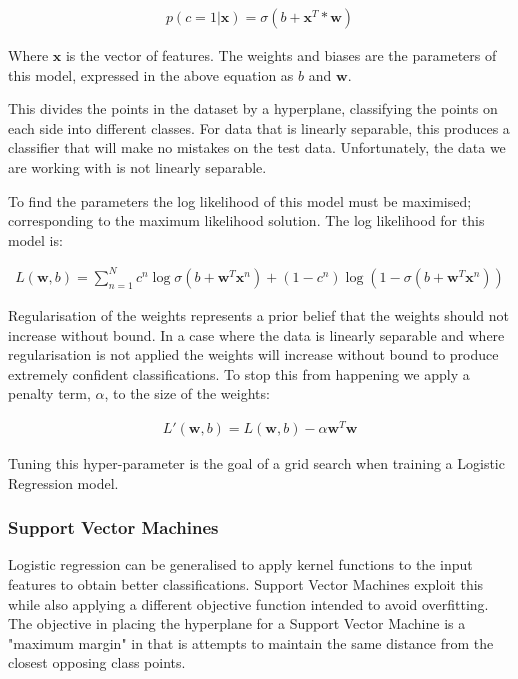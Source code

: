 \begin{align}
    p(c=1|\pmb{x}) = \sigma(b + \pmb{x}^{T}*\pmb{w})
\end{align}

Where $\pmb{x}$ is the vector of features.
The weights and biases are the parameters of this model, expressed in the above equation as $b$ and $\pmb{w}$.

This divides the points in the dataset by a hyperplane, classifying the points on each side into different classes.
For data that is linearly separable, this produces a classifier that will make no mistakes on the test data.
Unfortunately, the data we are working with is not linearly separable.

To find the parameters the log likelihood of this model must be maximised; corresponding to the maximum likelihood solution.
The log likelihood for this model is:

\begin{align}
    L(\pmb{w},b) = \sum_{n=1}^{N} c^{n} \log \sigma(b + \pmb{w}^{T}\pmb{x}^{n}) + (1 - c^{n})\log (1 - \sigma(b + \pmb{w}^{T}\pmb{x}^{n}))
\end{align}

Regularisation of the weights represents a prior belief that the weights should not increase without bound.
In a case where the data is linearly separable and where regularisation is not applied the weights will increase without bound to produce extremely confident classifications\autocite[381]{barber_bayesian_2013}.
To stop this from happening we apply a penalty term, $\alpha$, to the size of the weights:

\begin{align}
    L'(\pmb{w},b) = L(\pmb{w},b) - \alpha \pmb{w}^{T}\pmb{w}
\end{align}

Tuning this hyper-parameter is the goal of a grid search when training a Logistic Regression model.

\subsubsection*{Support Vector Machines}

Logistic regression can be generalised to apply kernel functions to the input features to obtain better classifications.
Support Vector Machines exploit this while also applying a different objective function intended to avoid overfitting\autocite[383]{murphy_machine_2012}.
The objective in placing the hyperplane for a Support Vector Machine is a "maximum margin" in that is attempts to maintain the same distance from the closest opposing class points.

